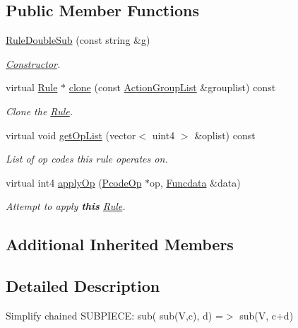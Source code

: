 \subsection*{Public Member Functions}
\begin{DoxyCompactItemize}
\item 
\mbox{\hyperlink{class_rule_double_sub_aeaa139cc2bc89403b05b2e84614fe983}{Rule\+Double\+Sub}} (const string \&g)
\begin{DoxyCompactList}\small\item\em \mbox{\hyperlink{class_constructor}{Constructor}}. \end{DoxyCompactList}\item 
virtual \mbox{\hyperlink{class_rule}{Rule}} $\ast$ \mbox{\hyperlink{class_rule_double_sub_a147bf9b04ba739cbf37cfad58970b23c}{clone}} (const \mbox{\hyperlink{class_action_group_list}{Action\+Group\+List}} \&grouplist) const
\begin{DoxyCompactList}\small\item\em Clone the \mbox{\hyperlink{class_rule}{Rule}}. \end{DoxyCompactList}\item 
virtual void \mbox{\hyperlink{class_rule_double_sub_a7db3af66a209f1ea878ff270099f4086}{get\+Op\+List}} (vector$<$ uint4 $>$ \&oplist) const
\begin{DoxyCompactList}\small\item\em List of op codes this rule operates on. \end{DoxyCompactList}\item 
virtual int4 \mbox{\hyperlink{class_rule_double_sub_a5dac7faa4ee8464a136b3bec0e2057ab}{apply\+Op}} (\mbox{\hyperlink{class_pcode_op}{Pcode\+Op}} $\ast$op, \mbox{\hyperlink{class_funcdata}{Funcdata}} \&data)
\begin{DoxyCompactList}\small\item\em Attempt to apply {\bfseries{this}} \mbox{\hyperlink{class_rule}{Rule}}. \end{DoxyCompactList}\end{DoxyCompactItemize}
\subsection*{Additional Inherited Members}


\subsection{Detailed Description}
Simplify chained S\+U\+B\+P\+I\+E\+CE\+: {\ttfamily sub( sub(\+V,c), d) =$>$ sub(V, c+d)} 

